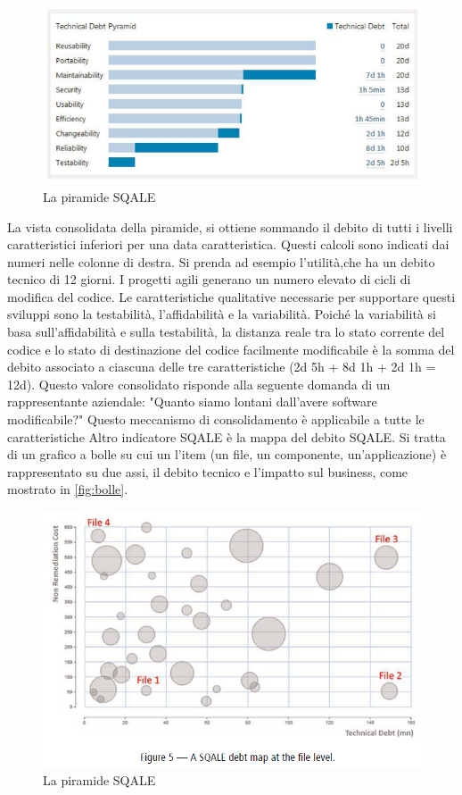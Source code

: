 \begin{figure}[htbp]
	\centering
	\includegraphics[scale=1, trim = 0cm 0cm 0cm 0cm, clip=true]{figSonarCloud/piramide.PNG}
	\caption{La piramide SQALE}
	\label{fig:piramide}
\end{figure}
La vista consolidata della piramide, si ottiene sommando il debito di tutti i livelli caratteristici inferiori per una data caratteristica.
Questi calcoli sono indicati dai numeri nelle colonne di destra. Si prenda ad esempio l'utilità,che ha un debito tecnico di 12 giorni. I progetti agili generano un numero elevato di cicli di modifica del codice. Le caratteristiche qualitative necessarie per supportare questi sviluppi sono la testabilità, l'affidabilità e la variabilità.
Poiché la variabilità si basa sull'affidabilità e sulla testabilità, la distanza reale tra lo stato corrente del codice e lo stato di destinazione del codice facilmente modificabile è la somma del debito associato a ciascuna delle tre caratteristiche (2d 5h + 8d 1h + 2d 1h = 12d). Questo valore consolidato risponde alla seguente domanda di un rappresentante aziendale: "Quanto siamo lontani dall'avere software modificabile?" Questo meccanismo di consolidamento è applicabile a tutte le caratteristiche
Altro indicatore SQALE è la mappa del debito SQALE. Si tratta di un grafico a bolle su cui un l'item (un file, un componente, un'applicazione) è rappresentato su due assi, il debito tecnico e l'impatto sul business, come mostrato in \autoref{fig:bolle}. 
\begin{figure}[htbp]
	\centering
	\includegraphics[scale=1, trim = 0cm 0cm 0cm 0cm, clip=true]{figSonarCloud/bolle.PNG}
	\caption{La piramide SQALE}
	\label{fig:bolle}
\end{figure}